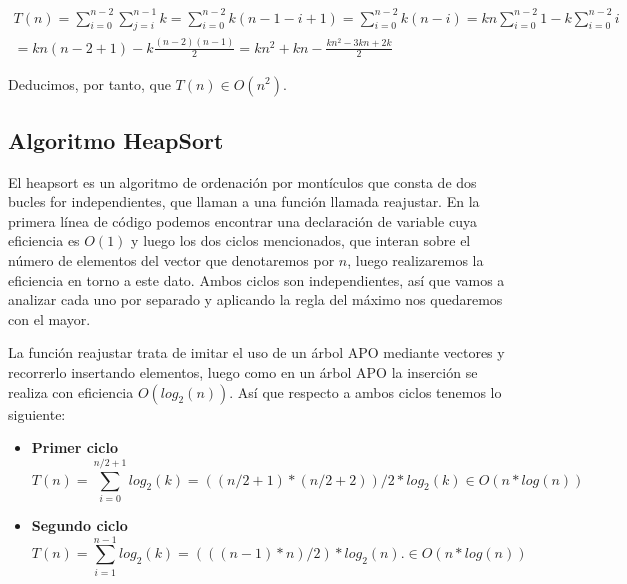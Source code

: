 \documentclass{homework}
\begin{document}
    \begin{equation*}
        \begin{split}
            T(n) = \sum_{i=0}^{n-2} \sum_{j=i}^{n-1} k = \sum_{i=0}^{n-2} k(n-1-i+1) = \sum_{i=0}^{n-2} k(n-i) = kn \sum_{i=0}^{n-2} 1  - k \sum_{i=0}^{n-2} i \\
            = kn(n-2+1) - k \frac{(n-2)(n-1)}{2} = kn^2 + kn - \frac{kn^2 - 3kn + 2k}{2}
        \end{split}
    \end{equation*}
    
    Deducimos, por tanto, que $T(n) \in O(n^2)$. 
    
    \subsection{Algoritmo HeapSort}
    
     

    El heapsort es un algoritmo de ordenación por montículos que consta de dos bucles for independientes, que llaman a una función llamada reajustar.
    En la primera línea de código podemos encontrar una declaración de variable cuya eficiencia es $O(1)$ y luego los dos ciclos mencionados, que interan 
    sobre el número de elementos del vector que denotaremos por $n$, luego realizaremos la eficiencia en torno a este dato. Ambos ciclos son independientes, 
    así que vamos a analizar cada uno por separado y aplicando la regla del máximo nos quedaremos con el mayor.
    
    La función reajustar trata de imitar el uso de un árbol APO mediante vectores y recorrerlo insertando elementos, luego como en un árbol APO la inserción se 
    realiza con eficiencia $O(log_2(n))$. Así que respecto a ambos ciclos tenemos lo siguiente:
    
    \begin{itemize}
        \item \textbf{Primer ciclo}
        \begin{equation*}
            T(n) = \sum_{i=0}^{n/2 + 1} log_2(k) = ((n/2 +1)*(n/2 + 2))/2 * log_2(k) \in O(n*log(n))
        \end{equation*} 

        \item \textbf{Segundo ciclo}
        \begin{equation*}
            T(n) = \sum_{i=1}^{n-1} log_2(k) = (((n-1)*n)/2) * log_2(n). \in O(n*log(n))
        \end{equation*}
        
    \end{itemize}
\end{document}
